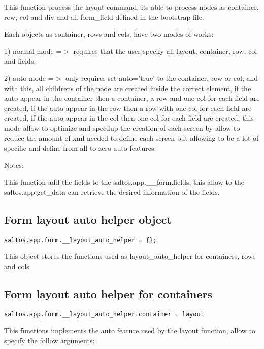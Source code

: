 \documentclass[a4paper]{book}
\begin{document}
This function process the layout command, its able to process nodes as container, row, col and div
and all form\_field defined in the bootstrap file.

Each objects as container, rows and cols, have two modes of works:

1) normal mode =$>$ requires that the user specify all layout, container, row, col and fields.

2) auto mode =$>$ only requires set auto='true' to the container, row or col, and with this, all childrens
of the node are created inside the correct element, if the auto appear in the container then a container,
a row and one col for each field are created, if the auto appear in the row then a row with one col for
each field are created, if the auto appear in the col then one col for each field are created, this mode
allow to optimize and speedup the creation of each screen by allow to reduce the amount of xml needed
to define each screen but allowing to be a lot of specific and define from all to zero auto features.

Notes:

This function add the fields to the saltos.app.\_\_form.fields, this allow to the saltos.app.get\_data
can retrieve the desired information of the fields.

\hypertarget{toc406}{}
\subsection{Form layout auto helper object}

\begin{lstlisting}
saltos.app.form.__layout_auto_helper = {};
\end{lstlisting}

This object stores the functions used as layout\_auto\_helper for containers, rows and cols

\hypertarget{toc407}{}
\subsection{Form layout auto helper for containers}

\begin{lstlisting}
saltos.app.form.__layout_auto_helper.container = layout
\end{lstlisting}

This functions implements the auto feature used by the layout function, allow to specify the
follow arguments:
\end{document}

